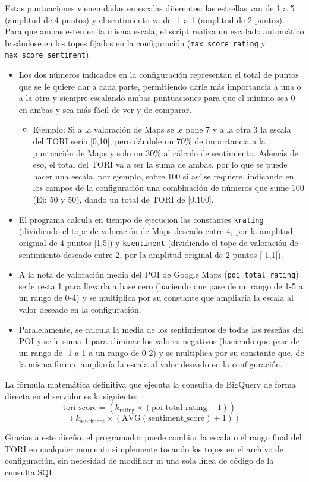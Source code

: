 \begin{itemize}
    Estas puntuaciones vienen dadas en escalas diferentes: las estrellas van de 1 a 5 (amplitud de 4 puntos) y el sentimiento va de -1 a 1 (amplitud de 2 puntos). Para que ambas estén en la misma escala, el script realiza un escalado automático basándose en los topes fijados en la configuración (\texttt{max\_score\_rating} y \texttt{max\_score\_sentiment}).

    \begin{itemize}
        \item Los dos números indicados en la configuración representan el total de puntos que se le quiere dar a cada parte, permitiendo darle más importancia a una o a la otra y siempre escalando ambas puntuaciones para que el mínimo sea 0 en ambas y sea más fácil de ver y de comparar. 
        \begin{itemize}
            \item Ejemplo: Si a la valoración de Maps se le pone 7 y a la otra 3 la escala del TORI sería [0,10], pero dándole un 70\% de importancia a la puntuación de Maps y solo un 30\% al cálculo de sentimiento. Además de eso, el total del TORI va a ser la suma de ambas, por lo que se puede hacer una escala, por ejemplo, sobre 100 si así se requiere, indicando en los campos de la configuración una combinación de números que sume 100 (Ej: 50 y 50), dando un total de TORI de [0,100].
        \end{itemize}
        \item El programa calcula en tiempo de ejecución las constantes \texttt{krating} (dividiendo el tope de valoración de Maps deseado entre 4, por la amplitud original de 4 puntos [1,5]) y \texttt{ksentiment} (dividiendo el tope de valoración de sentimiento deseado entre 2, por la amplitud original de 2 puntos [-1,1]). 
        \item A la nota de valoración media del POI de Google Maps (\texttt{poi\_total\-\_rating}) se le resta 1 para llevarla a base cero (haciendo que pase de un rango de 1-5 a un rango de 0-4) y se multiplica por su constante que ampliaría la escala al valor deseado en la configuración.
        \item Paralelamente, se calcula la media de los sentimientos de todas las reseñas del POI y se le suma 1 para eliminar los valores negativos (haciendo que pase de un rango de -1 a 1 a un rango de 0-2) y se multiplica por su constante que, de la misma forma, ampliaría la escala al valor deseado en la configuración.
    \end{itemize}
    
    La fórmula matemática definitiva que ejecuta la consulta de BigQuery de forma directa en el servidor es la siguiente:
    $$ \text{tori\_score} = \left( k_{\text{rating}} \times (\text{poi\_total\_rating} - 1) \right) + $$
    $$ \left( k_{\text{sentiment}} \times (\text{AVG}(\text{sentiment\_score}) + 1) \right) $$

    Gracias a este diseño, el programador puede cambiar la escala o el rango final del TORI en cualquier momento simplemente tocando los topes en el archivo de configuración, sin necesidad de modificar ni una sola línea de código de la consulta SQL.
\end{itemize}


